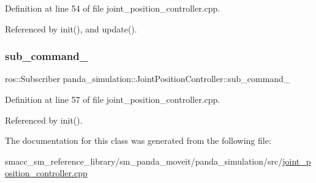 Definition at line 54 of file joint\+\_\+position\+\_\+controller.\+cpp.



Referenced by init(), and update().

\mbox{\label{classpanda__simulation_1_1JointPositionController_a770fa8018c5ee48c3142ee03c44a2941}} 
\subsubsection{\texorpdfstring{sub\+\_\+command\+\_\+}{sub\_command\_}}
{\footnotesize\ttfamily ros\+::\+Subscriber panda\+\_\+simulation\+::\+Joint\+Position\+Controller\+::sub\+\_\+command\+\_\+\hspace{0.3cm}{\ttfamily [private]}}



Definition at line 57 of file joint\+\_\+position\+\_\+controller.\+cpp.



Referenced by init().



The documentation for this class was generated from the following file\+:\begin{DoxyCompactItemize}
\item 
smacc\+\_\+sm\+\_\+reference\+\_\+library/sm\+\_\+panda\+\_\+moveit/panda\+\_\+simulation/src/\hyperlink{joint__position__controller_8cpp}{joint\+\_\+position\+\_\+controller.\+cpp}\end{DoxyCompactItemize}
